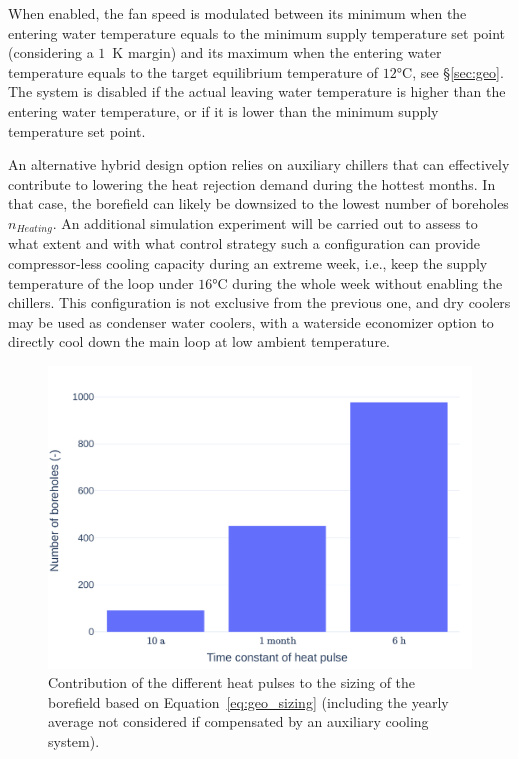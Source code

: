 When enabled, the fan speed is modulated between its minimum when the entering water temperature equals to the minimum supply temperature set point (considering a $1$~K margin) and its maximum when the entering water temperature equals to the target equilibrium temperature of $12$°C, see §\ref{sec:geo}.
The system is disabled if the actual leaving water temperature is higher than the entering water temperature, or if it is lower than the minimum supply temperature set point.

An alternative hybrid design option relies on auxiliary chillers that can effectively contribute to lowering the heat rejection demand during the hottest months. In that case, the borefield can likely be downsized to the lowest number of boreholes $n_{Heating}$.
An additional simulation experiment will be carried out to assess to what extent and with what control strategy such a configuration can provide compressor-less cooling capacity during an extreme week, i.e., keep the supply temperature of the loop under $16$°C during the whole week without enabling the chillers. This configuration is not exclusive from the previous one, and dry coolers may be used as condenser water coolers, with a waterside economizer option to directly cool down the main loop at low ambient temperature.

\begin{figure}[!htbp]
    \centering
    \includegraphics[width=.6\linewidth]{../python_scripts/figures/ContributionL.pdf}
    \caption{Contribution of the different heat pulses to the sizing of the borefield based on  Equation~\ref{eq:geo_sizing} (including the yearly average not considered if compensated by an auxiliary cooling system).}
    \label{fig:contribution_to_L}
\end{figure}

